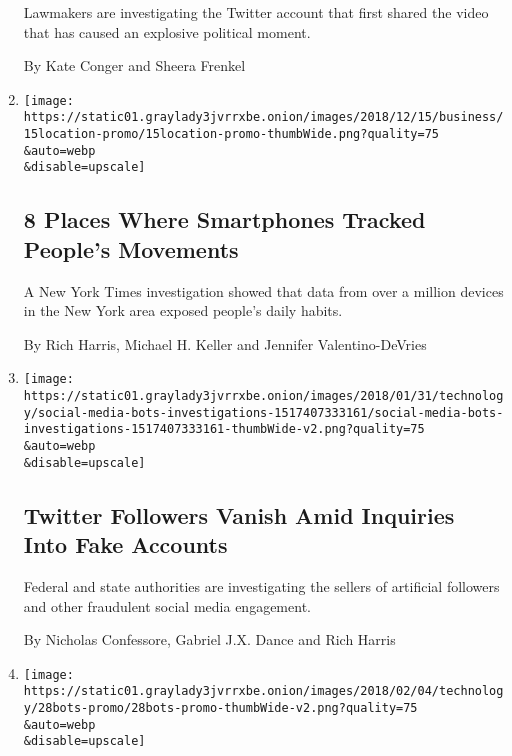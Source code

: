 \begin{enumerate}
  Lawmakers are investigating the Twitter account that first shared the
  video that has caused an explosive political moment.

  By Kate Conger and Sheera Frenkel
\item
  \href{/2018/12/15/business/location-tracking-phones.html}{}

  \texttt{[image: https://static01.graylady3jvrrxbe.onion/images/2018/12/15/business/15location-promo/15location-promo-thumbWide.png?quality=75\\\&auto=webp\\\&disable=upscale]}

  \hypertarget{8-places-where-smartphones-tracked-peoples-movements}{%
  \subsection{8 Places Where Smartphones Tracked People's
  Movements}\label{8-places-where-smartphones-tracked-peoples-movements}}

  A New York Times investigation showed that data from over a million
  devices in the New York area exposed people's daily habits.

  By Rich Harris, Michael H. Keller and Jennifer Valentino-DeVries
\item
  \href{/interactive/2018/01/31/technology/social-media-bots-investigations.html}{}

  \texttt{[image: https://static01.graylady3jvrrxbe.onion/images/2018/01/31/technology/social-media-bots-investigations-1517407333161/social-media-bots-investigations-1517407333161-thumbWide-v2.png?quality=75\\\&auto=webp\\\&disable=upscale]}

  \hypertarget{twitter-followers-vanish-amid-inquiries-into-fake-accounts}{%
  \subsection{Twitter Followers Vanish Amid Inquiries Into Fake
  Accounts}\label{twitter-followers-vanish-amid-inquiries-into-fake-accounts}}

  Federal and state authorities are investigating the sellers of
  artificial followers and other fraudulent social media engagement.

  By Nicholas Confessore, Gabriel J.X. Dance and Rich Harris
\item
  \href{/interactive/2018/01/27/technology/social-media-bots-es.html}{}

  \texttt{[image: https://static01.graylady3jvrrxbe.onion/images/2018/02/04/technology/28bots-promo/28bots-promo-thumbWide-v2.png?quality=75\\\&auto=webp\\\&disable=upscale]}


\end{enumerate}
